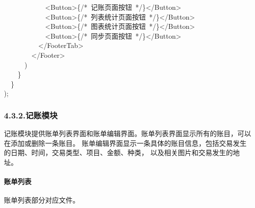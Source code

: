 \documentclass{article}
\begin{document}
\begin{mdpre}
~~~~~~~~~~~~\textless{}Button\textgreater{}\{{/*}{~记账页面按钮~}{*/}\}\textless{}/Button\textgreater{}\\
~~~~~~~~~~~~\textless{}Button\textgreater{}\{{/*}{~列表统计页面按钮~}{*/}\}\textless{}/Button\textgreater{}\\
~~~~~~~~~~~~\textless{}Button\textgreater{}\{{/*}{~图表统计页面按钮~}{*/}\}\textless{}/Button\textgreater{}\\
~~~~~~~~~~~~\textless{}Button\textgreater{}\{{/*}{~同步页面按钮~}{*/}\}\textless{}/Button\textgreater{}\\
~~~~~~~~~~\textless{}/FooterTab\textgreater{}\\
~~~~~~~~\textless{}/Footer\textgreater{}\\
~~~~~~)\\
~~~~\}\\
~~\}\\
);%
\end{mdpre}
\subsubsection{4.3.2.\hspace*{0.5em}记账模块}\label{section}%

\noindent{}记账模块提供账单列表界面和账单编辑界面。账单列表界面显示所有的账目，可以在添加或删除一条账目。
账单编辑界面显示一条具体的账目信息，包括交易发生的日期、时间，交易类型、项目、金额、种类，
以及相关图片和交易发生的地址。%

\paragraph{账单列表}\label{section}%

\noindent{}账单列表部分对应文件。%
\end{document}
